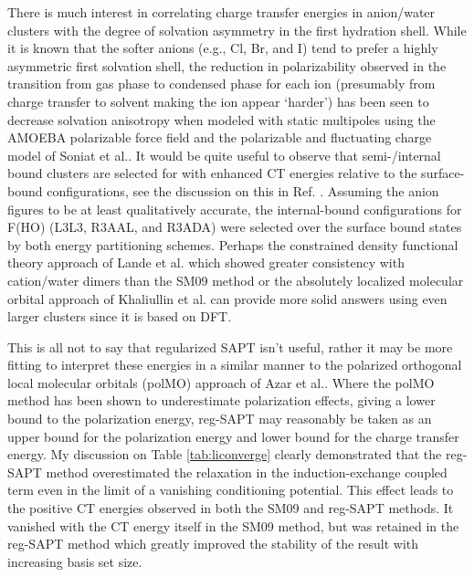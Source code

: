 \begin{sie}
  There is much interest in correlating charge transfer energies in anion/water clusters with the degree of solvation asymmetry in the first 
  hydration shell. While it is known that the softer anions (e.g., Cl\sur{-}, Br\sur{-}, and I\sur{-}) tend to prefer a highly asymmetric 
  first solvation shell, the reduction in polarizability observed in the transition from gas phase to condensed phase for each
  ion\cite{masia2013polar,patel2010polarizability} (presumably from charge transfer to solvent making the ion appear `harder') has been seen to
  decrease solvation anisotropy when modeled with static multipoles using the AMOEBA polarizable force field\cite{rogers2010ctpolar} and the
  polarizable and fluctuating charge model of Soniat et al.\cite{soniat2012ct}. It would be quite useful to observe that semi-/internal bound
  clusters are selected for with enhanced CT energies relative to the surface-bound configurations, see the discussion on this in Ref.
  \cite{kim2002bigall}. Assuming the anion figures to be at least qualitatively accurate, the internal-bound configurations for 
  F\sur{-}(HO) (L3L3, R3AAL, and R3ADA) were selected over the surface bound states by both energy partitioning schemes.
  Perhaps the constrained density functional theory approach of Lande et al.\cite{lande2015cdftct} which showed greater consistency with
  cation/water dimers\cite{lao2016cdftsapt} than the SM09 method or the absolutely localized molecular orbital approach of Khaliullin et 
  al.\cite{khaliullin2008almo} can provide more solid answers using even larger clusters since it is based on DFT.

  This is all not to say that regularized SAPT isn't useful, rather it may be more fitting to interpret these energies in a similar manner to
  the polarized orthogonal local molecular orbitals (polMO) approach of Azar et al.\cite{azar2013polmo}. Where the polMO method has been shown
  to underestimate polarization effects, giving a lower bound to the polarization energy, reg-SAPT may reasonably be taken as an upper bound 
  for the polarization energy and lower bound for the charge transfer energy. My discussion on Table \ref{tab:liconverge} clearly demonstrated 
  that the reg-SAPT method overestimated the relaxation in the induction-exchange coupled term even in the limit of a vanishing conditioning
  potential. This effect leads to the positive CT energies observed in both the SM09 and reg-SAPT methods. It vanished with the CT energy itself
  in the SM09 method, but was retained in the reg-SAPT method which greatly improved the stability of the result with increasing basis set size.


\end{sie}

